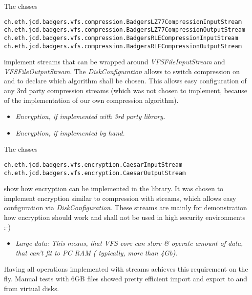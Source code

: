 The classes
\begin{verbatim}
ch.eth.jcd.badgers.vfs.compression.BadgersLZ77CompressionInputStream
ch.eth.jcd.badgers.vfs.compression.BadgersLZ77CompressionOutputStream
ch.eth.jcd.badgers.vfs.compression.BadgersRLECompressionInputStream
ch.eth.jcd.badgers.vfs.compression.BadgersRLECompressionOutputStream
\end{verbatim}
implement streams that can be wrapped around \textit{VFSFileInputStream} and
\textit{VFSFileOutputStream}. The \textit{DiskConfiguration} allows
to switch compression on and to declare which algorithm shall be chosen. This
allows easy configuration of any 3rd party compression streams (which was not
chosen to implement, because of the implementation of our own compression
algorithm).

\begin{itemize}
  \item \emph{Encryption, if implemented with 3rd party library.}
  \item \emph{Encryption, if implemented by hand.}
\end{itemize}

The classes
\begin{verbatim}
ch.eth.jcd.badgers.vfs.encryption.CaesarInputStream
ch.eth.jcd.badgers.vfs.encryption.CaesarOutputStream
\end{verbatim}
show how encryption can be implemented in the library. It was chosen to
implement encryption similar to compression with streams, which allows easy
configuration via \textit{DiskConfiguration}. These streams are mainly for
demonstration how encryption should work and shall not be used in high
security environments :-)

\begin{itemize}
  \item \emph{Large data: This means, that VFS core can store \& operate amount
  of data, that can't fit to PC RAM ( typically, more than 4Gb).}
\end{itemize}
Having all operations implemented with streams achieves this requirement on the
fly. Manual tests with 6GB files showed pretty efficient import and export to
and from virtual disks.

